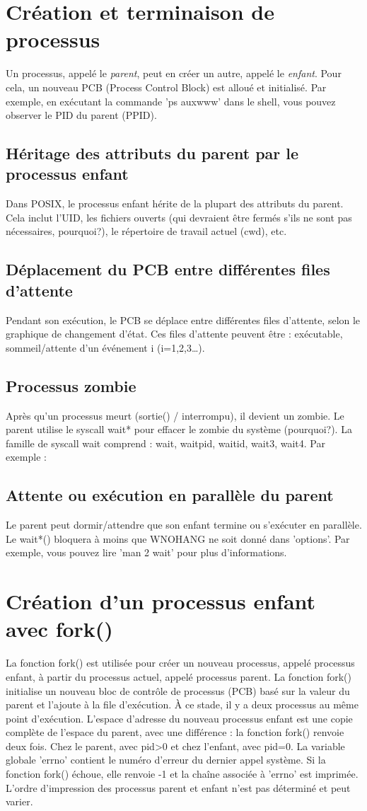 \documentclass[12pt]{report}
\begin{document}
  \section{Création et terminaison de processus}      Un processus, appelé le \textit{parent}, peut en créer un autre, appelé le \textit{enfant}. Pour cela, un nouveau PCB (Process Control Block) est alloué et initialisé. Par exemple, en exécutant la commande 'ps auxwww' dans le shell, vous pouvez observer le PID du parent (PPID).          \subsection{Héritage des attributs du parent par le processus enfant}      Dans POSIX, le processus enfant hérite de la plupart des attributs du parent. Cela inclut l'UID, les fichiers ouverts (qui devraient être fermés s'ils ne sont pas nécessaires, pourquoi?), le répertoire de travail actuel (cwd), etc.          \subsection{Déplacement du PCB entre différentes files d'attente}      Pendant son exécution, le PCB se déplace entre différentes files d'attente, selon le graphique de changement d'état. Ces files d'attente peuvent être : exécutable, sommeil/attente d'un événement i (i=1,2,3…).          \subsection{Processus zombie}      Après qu'un processus meurt (sortie() / interrompu), il devient un zombie. Le parent utilise le syscall wait* pour effacer le zombie du système (pourquoi?). La famille de syscall wait comprend : wait, waitpid, waitid, wait3, wait4. Par exemple :          \subsection{Attente ou exécution en parallèle du parent}      Le parent peut dormir/attendre que son enfant termine ou s'exécuter en parallèle. Le wait*() bloquera à moins que WNOHANG ne soit donné dans 'options'. Par exemple, vous pouvez lire 'man 2 wait' pour plus d'informations.         \section{Création d'un processus enfant avec fork()}   La fonction fork() est utilisée pour créer un nouveau processus, appelé processus enfant, à partir du processus actuel, appelé processus parent. La fonction fork() initialise un nouveau bloc de contrôle de processus (PCB) basé sur la valeur du parent et l'ajoute à la file d'exécution. À ce stade, il y a deux processus au même point d'exécution. L'espace d'adresse du nouveau processus enfant est une copie complète de l'espace du parent, avec une différence : la fonction fork() renvoie deux fois. Chez le parent, avec pid>0 et chez l'enfant, avec pid=0.   La variable globale 'errno' contient le numéro d'erreur du dernier appel système. Si la fonction fork() échoue, elle renvoie -1 et la chaîne associée à 'errno' est imprimée.   L'ordre d'impression des processus parent et enfant n'est pas déterminé et peut varier.   
\end{document}
